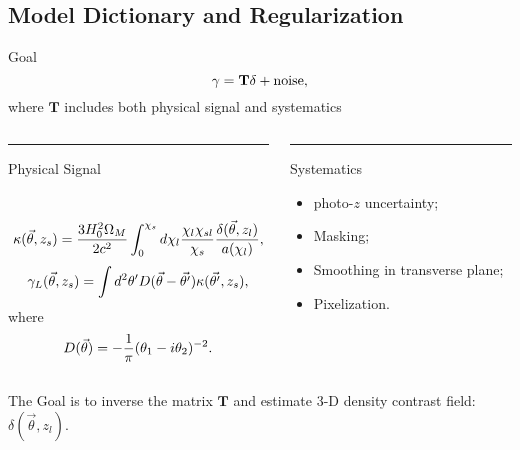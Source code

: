 \newcommand \figPathM{/home/xiangchong/.local/code/massMap_Private/doc/paper_ms_method_HSCY1/}
\newcommand \figPathMF{/home/xiangchong/.local/code/massMap_Private/doc/fig/}
\newcommand{\argmax}{\mathop{\rm arg~max}\limits}
\newcommand{\argmin}{\mathop{\rm arg~min}\limits}

\subsection{Model Dictionary and Regularization}
\begin{frame}{Goal}
\begin{equation} \notag
    \gamma=\mathbf{T} \delta+\rm{noise},
\end{equation}
where $\mathbf{T}$ includes both physical signal and systematics
\begin{columns}[t]
\begin{column}{0.5\textwidth}
{\color{blue}\rule{\linewidth}{4pt}
Physical Signal}\\
\begin{equation}\notag
\kappa(\vec{\theta},z_s)=\frac{3H_0^2\Omega_M}{2 c^2} \int_0^{\chi_s} d\chi_l \frac{\chi_l \chi_{sl}}{\chi_s}
\frac{\delta(\vec{\theta},z_l)}{a(\chi_l)},
\end{equation}
\begin{equation}\notag
\gamma_L(\vec{\theta},z_s) = \int  d^2 \theta' D(\vec{\theta}-\vec{\theta'}) \kappa(\vec{\theta'},z_s),
\end{equation}
where
\begin{equation}\notag
D(\vec{\theta})=-\frac{1}{\pi}(\theta_1-i\theta_2)^{-2}.
\end{equation}
\end{column}
\hfill
\begin{column}{0.5\textwidth}
{\color{red}\rule{\linewidth}{4pt}
Systematics}
\begin{itemize}
    \item photo-$z$ uncertainty;
    \item Masking;
    \item Smoothing in transverse plane;
    \item Pixelization.
\end{itemize}
\end{column}
\end{columns}
\alert{The Goal is to inverse the matrix $\mathbf{T}$ and estimate
$3$-D density contrast field: $\delta(\vec{\theta},z_l)$.}
\end{frame}

